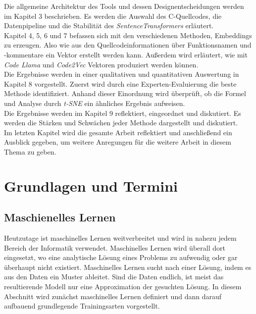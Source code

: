 \documentclass[12pt,letterpaper,ngerman]{article}
\begin{document}
Die allgemeine Architektur des Tools und dessen Designentscheidungen werden im Kapitel 3
beschrieben. Es werden die Auswahl des C-Quellcodes, die Datenpipeline und die 
Stabilität des \textit{SentenceTransformers} erläutert.\\

Kapitel 4, 5, 6 und 7 befassen sich mit den verschiedenen Methoden, Embeddings
zu erzeugen. Also wie aus den Quellcodeinformationen über Funktionsnamen und
-kommentare ein Vektor erstellt werden kann. Außerdem wird erläutert, wie mit
\textit{Code Llama} und \textit{Code2Vec} Vektoren produziert werden können.\\

Die Ergebnisse werden in einer qualitativen und quantitativen Auswertung in 
Kapitel 8 vorgestellt. Zuerst wird durch eine Experten-Evaluierung die beste
Methode identifiziert. Anhand dieser Einordnung wird überprüft, ob die Formel
und Analyse durch \textit{t-SNE} ein ähnliches Ergebnis aufweisen.\\

Die Ergebnisse werden im Kapitel 9 reflektiert, eingeordnet und diskutiert. 
Es werden die Stärken und Schwächen jeder Methode dargestellt und diskutiert.\\

Im letzten Kapitel wird die gesamte Arbeit reflektiert und anschließend ein 
Ausblick gegeben, um weitere Anregungen für die weitere Arbeit in diesem Thema
zu geben.

\pagebreak
\section{Grundlagen und Termini}
\subsection{Maschienelles Lernen}
Heutzutage ist maschinelles Lernen weitverbreitet und wird in nahezu jedem
Bereich der Informatik verwendet.  Maschinelles Lernen wird überall dort 
eingesetzt, wo eine analytische Lösung eines Problems zu aufwendig oder gar 
überhaupt nicht existiert. Maschinelles Lernen sucht nach einer Lösung, indem 
es aus den Daten ein Muster ableitet. Sind die Daten endlich, ist meist das 
resultierende Modell nur eine Approximation der gesuchten Lösung. In diesem 
Abschnitt wird zunächst maschinelles Lernen definiert und dann darauf aufbauend 
grundlegende Trainingsarten vorgestellt.
\end{document}
